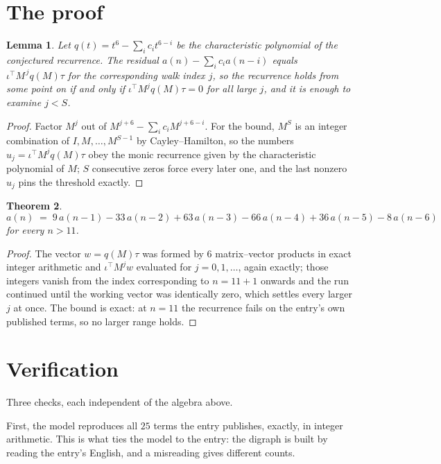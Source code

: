 \documentclass[11pt,a4paper]{article}
\theoremstyle{plain}
\newtheorem{theorem}{Theorem}
\newtheorem{lemma}[theorem]{Lemma}
\theoremstyle{definition}
\begin{document}
\section{The proof}

\begin{lemma}\label{lem:crit}
Let $q(t)=t^{6}-\sum_i c_it^{6-i}$ be the characteristic polynomial of the
conjectured recurrence. The residual $a(n)-\sum_ic_ia(n-i)$ equals
$\iota^{\!\top}M^{\,j}q(M)\tau$ for the corresponding walk index $j$, so the recurrence
holds from some point on if and only if $\iota^{\!\top}M^{j}q(M)\tau=0$ for all large $j$,
and it is enough to examine $j<S$.
\end{lemma}

\begin{proof}
Factor $M^{j}$ out of $M^{j+6}-\sum_ic_iM^{j+6-i}$. For the bound, $M^{S}$
is an integer combination of $I,M,\dots,M^{S-1}$ by Cayley--Hamilton, so the numbers
$u_j=\iota^{\!\top}M^{j}q(M)\tau$ obey the monic recurrence given by the characteristic
polynomial of $M$; $S$ consecutive zeros force every later one, and the last nonzero $u_j$
pins the threshold exactly.
\end{proof}

\begin{theorem}
\[
a(n)\;=\;9\,a(n-1) - 33\,a(n-2) + 63\,a(n-3) - 66\,a(n-4) + 36\,a(n-5) - 8\,a(n-6)
\]
for every $n>11$.
\end{theorem}

\begin{proof}
The vector $w=q(M)\tau$ was formed by $6$ matrix--vector products in exact integer
arithmetic and $\iota^{\!\top}M^{j}w$ evaluated for $j=0,1,\dots$, again exactly; those
integers vanish from the index corresponding to $n=11+1$ onwards and the run continued
until the working vector was identically zero, which settles every larger $j$ at once. The bound is exact: at $n=11$ the recurrence fails on the entry's own published terms, so no larger range holds.
\end{proof}

\section{Verification}

Three checks, each independent of the algebra above.

First, the model reproduces all $25$ terms the entry publishes, exactly, in integer
arithmetic. This is what ties the model to the entry: the digraph is built by reading the
entry's English, and a misreading gives different counts.
\end{document}
